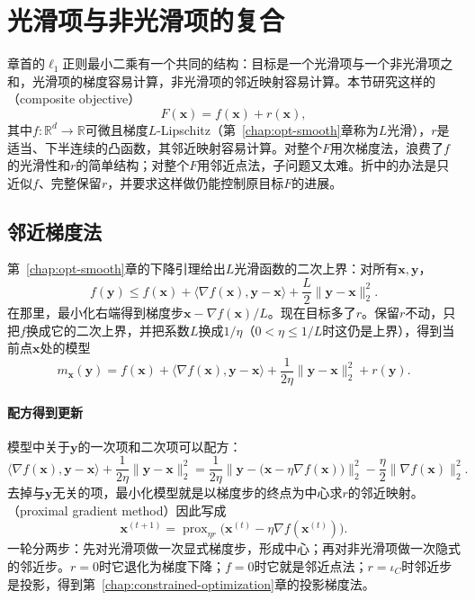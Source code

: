 \section{光滑项与非光滑项的复合}
\label{sec:opt-ns-composite}

章首的$\ell_1$正则最小二乘有一个共同的结构：目标是一个光滑项与一个非光滑项之和，光滑项的梯度容易计算，非光滑项的邻近映射容易计算。本节研究这样的（composite objective）
\begin{equation}
 F(\bm x)=f(\bm x)+r(\bm x),
 \label{eq:opt-ns-composite}
\end{equation}
其中$f:\mathbb R^d\to\mathbb R$可微且梯度$L$-Lipschitz（第~\ref{chap:opt-smooth}章称为$L$光滑），$r$是适当、下半连续的凸函数，其邻近映射容易计算。对整个$F$用次梯度法，浪费了$f$的光滑性和$r$的简单结构；对整个$F$用邻近点法，子问题又太难。折中的办法是只近似$f$、完整保留$r$，并要求这样做仍能控制原目标$F$的进展。

\subsection{邻近梯度法}
\label{sec:opt-ns-proximal-gradient}

第~\ref{chap:opt-smooth}章的下降引理给出$L$光滑函数的二次上界：对所有$\bm x,\bm y$，
\begin{equation}
 f(\bm y)\leq f(\bm x)+\langle\nabla f(\bm x),\bm y-\bm x\rangle+\frac L2\lVert\bm y-\bm x\rVert_2^2 .
 \label{eq:opt-ns-descent-lemma}
\end{equation}
在那里，最小化右端得到梯度步$\bm x-\nabla f(\bm x)/L$。现在目标多了$r$。保留$r$不动，只把$f$换成它的二次上界，并把系数$L$换成$1/\eta$（$0<\eta\leq1/L$时这仍是上界），得到当前点$\bm x$处的模型
\[
 m_{\bm x}(\bm y)=f(\bm x)+\langle\nabla f(\bm x),\bm y-\bm x\rangle+\frac1{2\eta}\lVert\bm y-\bm x\rVert_2^2+r(\bm y).
\]

\paragraph{配方得到更新}
模型中关于$\bm y$的一次项和二次项可以配方：
\[
 \langle\nabla f(\bm x),\bm y-\bm x\rangle+\frac1{2\eta}\lVert\bm y-\bm x\rVert_2^2
 =\frac1{2\eta}\bigl\lVert\bm y-\bigl(\bm x-\eta\nabla f(\bm x)\bigr)\bigr\rVert_2^2-\frac\eta2\lVert\nabla f(\bm x)\rVert_2^2 .
\]
去掉与$\bm y$无关的项，最小化模型就是以梯度步的终点为中心求$r$的邻近映射。（proximal gradient method）因此写成
\begin{equation}
 \bm x^{(t+1)}=\operatorname{prox}_{\eta r}\bigl(\bm x^{(t)}-\eta\nabla f(\bm x^{(t)})\bigr).
 \label{eq:opt-ns-proximal-gradient}
\end{equation}
一轮分两步：先对光滑项做一次显式梯度步，形成中心；再对非光滑项做一次隐式的邻近步。$r=0$时它退化为梯度下降；$f=0$时它就是邻近点法；$r=\iota_C$时邻近步是投影，得到第~\ref{chap:constrained-optimization}章的投影梯度法。

